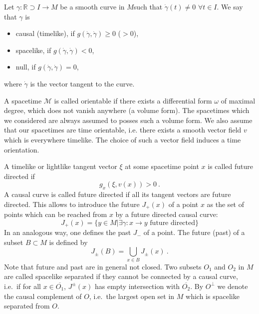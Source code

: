 \documentclass[11pt]{article}
\newcommand{\Mcal}{\mathcal{M}}
\newcommand{\RR}{\mathbb{R}}           %
\newcommand{\1}{\mathds{1}}                         %
\begin{document}
\begin{df}
Let $\gamma: \RR\supset I\rightarrow M$ be a smooth curve in $M$such that $\dot{\gamma}(t)\neq0$ $\forall t\in I$. We say that $\gamma$ is 
\begin{itemize}
\item causal (timelike), if  $g(\dot{\gamma},\dot{\gamma})\geq 0$ ($>0$),
\item spacelike, if  $g(\dot{\gamma},\dot{\gamma})< 0$,
\item null, if  $g(\dot{\gamma},\dot{\gamma})= 0$,
\end{itemize}
where $\dot{\gamma}$ is the vector tangent to the curve.
\end{df}

A spacetime $\Mcal$ is called orientable if there exists a differential form $\omega$ of maximal degree, which does not vanish anywhere  (a volume form). The spacetimes which we considered are always assumed to posses such a volume form. We also assume that our spacetimes are time orientable, i.e. there exists a smooth vector field $v$ which is everywhere timelike. The choice of such a vector field  induces a time orientation.

A timelike or lightlike tangent vector $\xi$ at some spacetime point $x$ is called future directed if 
\[g_x(\xi,v(x))>0\ .\] 
A causal curve is called future directed if all its tangent vectors are future directed. This allows to introduce the future $J_+(x)$ of a point $x$ as the set of points which can be reached from $x$ by a future directed causal curve:
\[J_{+}(x)=\{y\in M| \exists \gamma:x\to y \text{ future directed}\}\] 
In an analogous way, one defines the past $J_-$ of a point. The future (past) of a subset $B\subset M$ is defined by
\[J_\pm(B)=\bigcup_{x\in B}J_\pm(x)\ .\]
Note that future and past are in general not closed. 
Two subsets $O_1$ and $O_2$ in $M$ are called
spacelike separated if they cannot be connected by a causal curve, i.e.\
if for all $x \in \overline{O_1}$,
 $J^{\pm}(x)$ has empty intersection with $\overline{O_2}$.
By $O^{\perp}$ we denote the causal complement of $O$, i.e.\ the
largest open set in $M$ which is spacelike separated from $O$.
\end{document}
